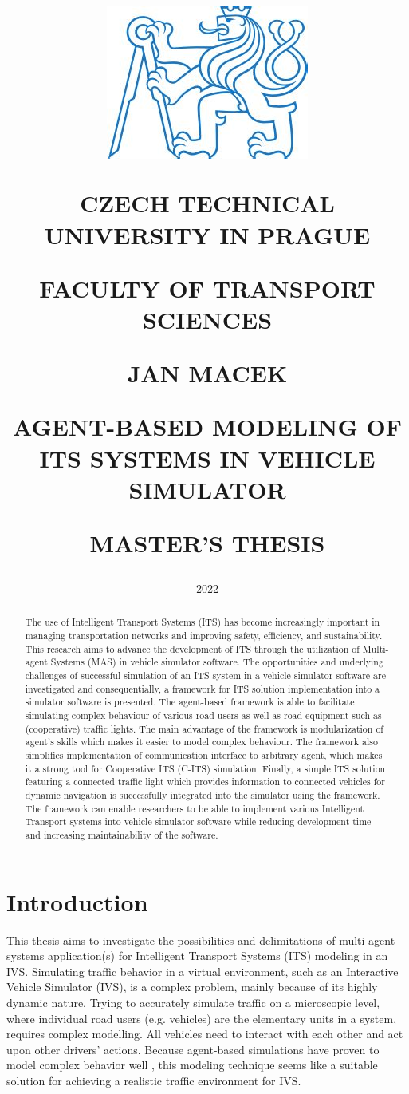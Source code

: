 \documentclass[titlepage, 12pt]{article}
\title{
\includegraphics[width=.3\textwidth]{cvut-logo.jpg}\par
\vspace{10mm}
\indent
\textbf{CZECH TECHNICAL UNIVERSITY IN PRAGUE}

FACULTY OF TRANSPORT SCIENCES

\vfill

{\Large JAN MACEK}
\vspace{10mm}

AGENT-BASED MODELING OF ITS SYSTEMS IN VEHICLE SIMULATOR 
\vspace{15mm}

{\Large MASTER'S THESIS}
\vfill

}
\date{\Large 2022}
\begin{document}
\setlength{\baselineskip}{1.5em}
\maketitle



\begin{abstract}
    The use of Intelligent Transport Systems (ITS) has become increasingly important in
    managing transportation networks and improving safety, efficiency, and sustainability. This
    research aims to advance the development of ITS through the utilization of Multi-agent
    Systems (MAS) in vehicle simulator software. The opportunities and underlying challenges of
    successful  simulation of an ITS system in a vehicle simulator software are investigated
    and consequentially, a framework for ITS solution implementation into a simulator software
    is presented. The agent-based framework is able to facilitate simulating complex behaviour
    of various road users as well as road equipment such as (cooperative) traffic lights. The
    main advantage of the framework is modularization of agent's skills which makes it easier
    to model complex behaviour. The framework also simplifies implementation of communication
    interface to arbitrary agent, which makes it a strong tool for Cooperative ITS (C-ITS)
    simulation. Finally, a simple ITS solution featuring a connected traffic light which
    provides information to connected vehicles for dynamic navigation is successfully
    integrated into the simulator using the framework. The framework can enable researchers to
    be able to implement various Intelligent Transport systems into vehicle simulator software
    while reducing development time and increasing maintainability of the software.
    \end{abstract}

\tableofcontents
\listoftables
\listoffigures
\newpage

\section{Introduction}

This thesis aims to investigate the possibilities and delimitations of multi-agent systems
application(s) for Intelligent Transport Systems (ITS) modeling in an IVS. Simulating traffic
behavior in a virtual environment, such as an Interactive Vehicle Simulator (IVS), is a complex
problem, mainly because of its highly dynamic nature. Trying to accurately simulate traffic on
a microscopic level, where individual road users (e.g. vehicles) are the elementary units in a
system, requires complex modelling. All vehicles need to interact with each other and act upon
other drivers' actions. Because agent-based simulations have proven to model complex behavior
well \cite{Shoham}, this modeling technique seems like a suitable solution for achieving a realistic traffic
environment for IVS. 
\end{document}
